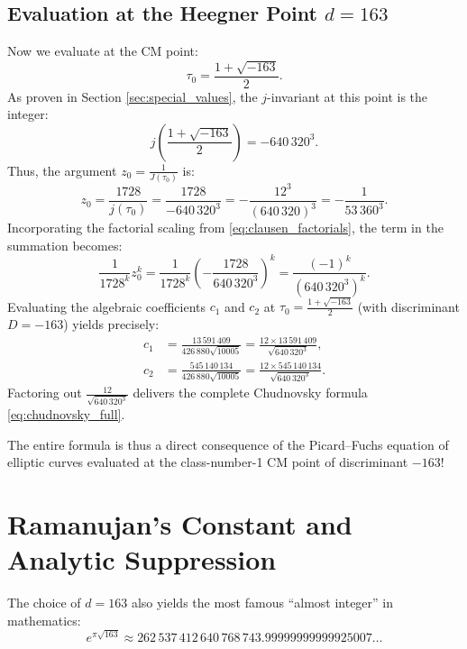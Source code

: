 \documentclass[a4paper]{article}
\begin{document}
\subsection{Evaluation at the Heegner Point \texorpdfstring{$d = 163$}{d = 163}}
Now we evaluate at the CM point:
\begin{equation}
 \tau_0 = \frac{1 + \sqrt{-163}}{2}.
\end{equation}
As proven in Section \ref{sec:special_values}, the $j$-invariant at this point is the integer:
\begin{equation}
 j\left(\frac{1+\sqrt{-163}}{2}\right) = -640\,320^3.
\end{equation}
Thus, the argument $z_0 = \frac{1}{J(\tau_0)}$ is:
\begin{equation}
 z_0 = \frac{1728}{j(\tau_0)} = \frac{1728}{-640\,320^3} = -\frac{12^3}{(640\,320)^3} = -\frac{1}{53\,360^3}.
\end{equation}
Incorporating the factorial scaling from \eqref{eq:clausen_factorials}, the term in the summation becomes:
\begin{equation}
 \frac{1}{1728^k} z_0^k = \frac{1}{1728^k} \left(-\frac{1728}{640\,320^3}\right)^k = \frac{(-1)^k}{\left(640\,320^3\right)^k}.
\end{equation}
Evaluating the algebraic coefficients $c_1$ and $c_2$ at $\tau_0 = \frac{1+\sqrt{-163}}{2}$ (with discriminant $D = -163$) yields precisely:
\begin{align}
 c_1 &= \frac{13\,591\,409}{426\,880 \sqrt{10005}} = \frac{12 \times 13\,591\,409}{\sqrt{640\,320^3}}, \\
 c_2 &= \frac{545\,140\,134}{426\,880 \sqrt{10005}} = \frac{12 \times 545\,140\,134}{\sqrt{640\,320^3}}.
\end{align}
Factoring out $\frac{12}{\sqrt{640\,320^3}}$ delivers the complete Chudnovsky formula \eqref{eq:chudnovsky_full}. 

The entire formula is thus a direct consequence of the Picard--Fuchs equation of elliptic curves evaluated at the class-number-1 CM point of discriminant $-163$!

\section{Ramanujan's Constant and Analytic Suppression}
\label{sec:ramanujan_constant}

The choice of $d = 163$ also yields the most famous ``almost integer'' in mathematics:
\begin{equation}
 e^{\pi \sqrt{163}} \approx 262\,537\,412\,640\,768\,743.99999999999925007\dots
\end{equation}
\end{document}
